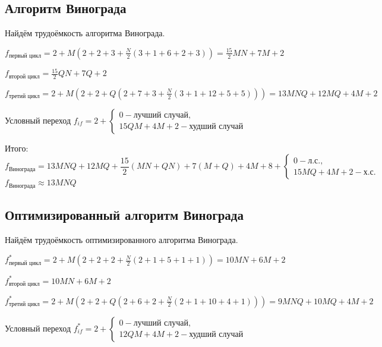         \subsection{Алгоритм Винограда}
            Найдём трудоёмкость алгоритма Винограда.
            
            $ f_\text{первый цикл} = 2 + M(2 + 2 + 3 + \frac{N}{2}(3 + 1 + 6 + 2 + 3)) = \frac{15}{2}MN + 7M + 2$
            
            $ f_\text{второй цикл} = \frac{15}{2}QN + 7Q + 2$

            $ f_\text{третий цикл} = 2 + M(2 + 2 + Q(2 + 7 + 3 + \frac{N}{2}(3 + 1 + 12 + 5 + 5))) = 13MNQ + 12MQ + 4M + 2$

            Условный переход $f_{if} = 2 + \left\{
                \begin{matrix}
                0 - \text{лучший случай},\\
                15QM + 4M + 2 - \text{худший случай} 
                \end{matrix}\right.$

            Итого:
            \begin{equation}
                f_\text{Винограда} = 13MNQ + 12MQ + \frac{15}{2}(MN + QN) + 7(M + Q) + 4M + 8 + 
                    \left\{ \begin{matrix}
                    0 - \text{л.с.},\\
                    15MQ + 4M + 2 - \text{х.с.} 
                    \end{matrix}\right.
            \end{equation}
            $ f_\text{Винограда} \approx 13MNQ $
        \subsection{Оптимизированный алгоритм Винограда}

            Найдём трудоёмкость оптимизированного алгоритма Винограда.
                
            $ f_\text{первый цикл}^* = 2 + M(2 + 2 + 2 + \frac{N}{2}(2 + 1 + 5 + 1 + 1)) = 10MN + 6M + 2$
            
            $ f_\text{второй цикл}^* = 10MN + 6M + 2$

            $ f_\text{третий цикл}^* = 2 + M(2 + 2 + Q(2 + 6 + 2 + \frac{N}{2}(2 + 1 + 10 + 4 + 1))) = 9MNQ + 10MQ + 4M + 2$

            Условный переход $f_{if}^* = 2 + \left\{
                \begin{matrix}
                0 - \text{лучший случай},\\
                12QM + 4M + 2 - \text{худший случай} 
                \end{matrix}\right.$

